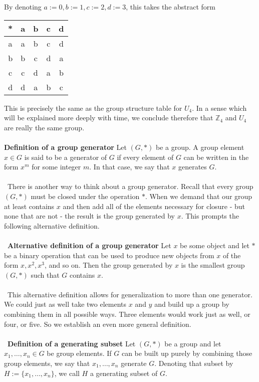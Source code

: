 \documentclass[12 pt]{article}
\newcommand{\Z}{\mathbb{Z}}
\numberwithin{equation}{section}
\begin{document}
By denoting $a:= 0, b:=1, c:=2, d:=3$, this takes the abstract form
\begin{center}
\begin{tabular}{c | c c c c}
* & a & b & c & d \\
\hline
a & a & b & c & d \\
b & b & c & d & a \\
c & c & d & a & b \\
d & d & a & b & c
\end{tabular}
\end{center}
This is precisely the same as the group structure table for $U_4$. In a sense which will be explained more deeply with time, we conclude therefore that $\Z_4$ and $U_4$ are really the same group.
\\
\\
\textbf{Definition of a group generator} Let $(G, *)$ be a group. A group element $x \in G$ is said to be a generator of $G$ if every element of $G$ can be written in the form $x^m$ for some integer $m$. In that case, we say that $x$ generates $G$.\\
\\
\
There is another way to think about a group generator. Recall that every group $(G,*)$ must be closed under the operation $*$. When we demand that our group at least contains $x$ and then add all of the elements necessary for closure - but none that are not - the result is the group generated by $x$. This prompts the following alternative definition.\\
\\
\
\textbf{Alternative definition of a group generator} Let $x$ be some object and let $*$ be a binary operation that can be used to produce new objects from $x$ of the form $x, x^2, x^3$, and so on. Then the group generated by $x$ is the smallest group $(G,*)$ such that $G$ contains $x$.\\
\\
\
This alternative definition allows for generalization to more than one generator. We could just as well take two elements $x$ and $y$ and build up a group by combining them in all possible ways. Three elements would work just as well, or four, or five. So we establish an even more general definition.\\
\\
\
\textbf{Definition of a generating subset} Let $(G, *)$ be a group and let $x_1, \ldots, x_n \in G$ be group elements. If $G$ can be built up purely by combining those group elements, we say that $x_1, \ldots, x_n$ generate $G$. Denoting that subset by $H := \{x_1, \ldots, x_n\}$, we call $H$ a generating subset of $G$.
\end{document}
